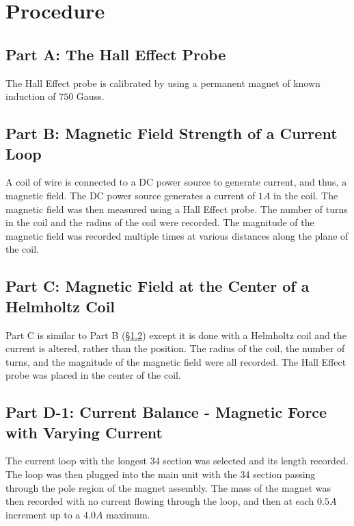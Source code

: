 \documentclass[titlepage]{article}
\begin{document}
\section{Procedure}\label{sec:procedure}
\subsection{Part A: The Hall Effect Probe}\label{sub:part_a_the_hall_effect_probe-proc}
The Hall Effect probe is calibrated by using a permanent magnet of known induction of $750$ Gauss.

\subsection{Part B: Magnetic Field Strength of a Current Loop}\label{sub:part_b_magnetic_field_strength_of_a_current_loop-proc}
A coil of wire is connected to a DC power source to generate current, and thus, a magnetic field. The DC power source generates a current of $1 A$ in the coil. The magnetic field was then measured using a Hall Effect probe. The number of turns in the coil and the radius of the coil were recorded. The magnitude of the magnetic field was recorded multiple times at various distances along the plane of the coil.

\subsection{Part C: Magnetic Field at the Center of a Helmholtz Coil}\label{sub:part_c_magnetic_field_at_the_center_of_a_helmholtz_coil-proc}
Part C is similar to Part B (\S \ref{sub:part_b_magnetic_field_strength_of_a_current_loop-proc}) except it is done with a Helmholtz coil and the current is altered, rather than the position. The radius of the coil, the number of turns, and the magnitude of the magnetic field were all recorded. The Hall Effect probe was placed in the center of the coil.

\subsection{Part D-1: Current Balance - Magnetic Force with Varying Current}\label{sub:part_d_1_current_balance_magnetic_force_with_varying_current-proc}
The current loop with the longest 3­4 section was selected and its length recorded. The loop was then plugged into the main unit with the 3­4 section passing through the pole region of the magnet assembly.  The mass of the magnet was then recorded with no current flowing through the loop, and then at each $0.5A$ increment up to a $4.0A$ maximum.
\end{document}
